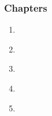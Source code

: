 \begin{frame}[fragile,label=outline] 
\frametitle{Chapters}
\begin{center}
\begin{minipage}{3.25in}
\begin{enumerate}
\item  \hyperlink{s-intro<1>}      {\BUTTON {\orow{\sIntro}}} \\
\item  \hyperlink{s-project<1>}    {\BUTTON {\erow{\sProject}}} \\
\item  \hyperlink{s-present<1>}    {\BUTTON {\orow{\sPresent}}} \\
\item  \hyperlink{s-recent<1>}     {\BUTTON {\erow{\sRecent}}} \\
\item  \hyperlink{s-future<1>}     {\BUTTON {\orow{\sFuture}}} \\
\end{enumerate}
\end{minipage}
\end{center}
\end{frame}


\NEWMOD \section{\sIntro}

